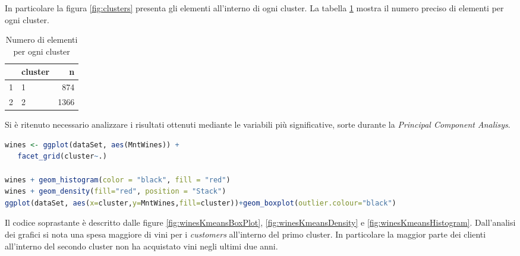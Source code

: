 \documentclass[letterpaper,11pt]{article}
\begin{document}
In particolare la figura \ref{fig:clusters} presenta gli elementi all'interno di ogni cluster. La tabella \ref{fig:clustersnumberelements} mostra il numero preciso di elementi per ogni cluster.
\begin{table}[H]
\centering
\begin{tabular}{rlr}
  \hline
 & cluster & n \\ 
  \hline
1 & 1 & 874 \\ 
  2 & 2 & 1366 \\ 
   \hline
\end{tabular}
\caption{Numero di elementi per ogni cluster}
\label{fig:clustersnumberelements}
\end{table}
Si è ritenuto necessario analizzare i risultati ottenuti mediante le variabili più significative, sorte durante la \textit{Principal Component Analisys}. 
\begin{lstlisting}[language=R]
wines <- ggplot(dataSet, aes(MntWines)) + 
   facet_grid(cluster~.) 

wines + geom_histogram(color = "black", fill = "red") 
wines + geom_density(fill="red", position = "Stack")
ggplot(dataSet, aes(x=cluster,y=MntWines,fill=cluster))+geom_boxplot(outlier.colour="black")
\end{lstlisting}
Il codice soprastante è descritto dalle figure \ref{fig:winesKmeansBoxPlot}, \ref{fig:winesKmeansDensity} e \ref{fig:winesKmeansHistogram}. Dall'analisi dei grafici si nota una spesa maggiore di vini per i \textit{customers} all'interno del primo cluster. In particolare la maggior parte dei clienti all'interno del secondo cluster non ha acquistato vini negli ultimi due anni. 
\end{document}
